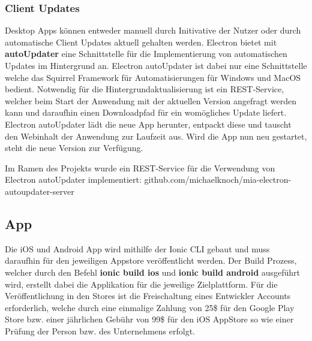 \subsubsection{Client Updates}

Desktop Apps können entweder manuell durch Initivative der Nutzer oder durch
automatische Client Updates aktuell gehalten werden.
Electron bietet mit \textbf{autoUpdater} eine Schnittstelle für die Implementierung
von automatischen Updates im Hintergrund an.
Electron autoUpdater ist dabei nur eine Schnittstelle welche das Squirrel Framework
für Automatisierungen für Windows und MacOS bedient.
Notwendig für die Hintergrundaktualisierung ist ein REST-Service, welcher beim Start der Anwendung mit der
aktuellen Version angefragt werden kann
und daraufhin einen Downloadpfad für ein womögliches Update liefert.
Electron autoUpdater lädt die neue App herunter, entpackt diese und tauscht den Webinhalt der Anwendung zur Laufzeit aus.
Wird die App nun neu gestartet, steht die neue Version zur Verfügung.

Im Ramen des Projekts \projectname{} wurde ein REST-Service für die 
Verwendung von Electron autoUpdater implementiert:
github.com/michaelknoch/mia-electron-autoupdater-server

\subsection{App}

Die iOS und Android App wird mithilfe der Ionic \ac{CLI} gebaut und muss daraufhin für den
jeweiligen Appstore veröffentlicht werden. Der Build Prozess,
welcher durch den Befehl \textbf{ionic build ios} und \textbf{ionic build android} ausgeführt wird,
erstellt dabei die Applikation für die jeweilige Zielplattform.
Für die Veröffentlichung in den Stores ist die Freischaltung eines Entwickler Accounts erforderlich,
welche durch eine einmalige Zahlung von 25\$ für den Google Play Store bzw. einer jährlichen Gebühr von 99\$
für den iOS AppStore so wie einer Prüfung der Person bzw. des Unternehmens erfolgt.

